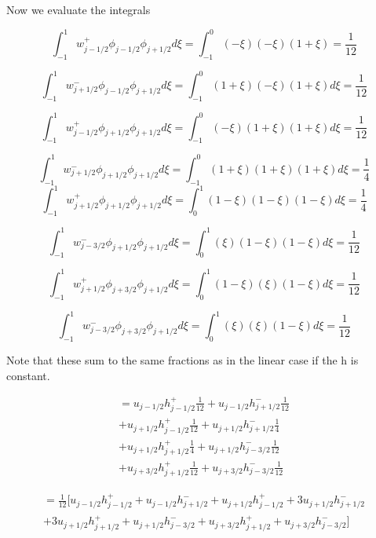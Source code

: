 \documentclass[12pt]{article}
\begin{document}
Now we evaluate the integrals

\[\int_{-1}^{1} w^+_{j - 1/2}\phi_{j - 1/2}\phi_{j+1/2}d\xi = \int_{-1}^{0}\left(-\xi\right)\left(-\xi\right)\left(1 + \xi\right)  =  \frac{1}{12 }\]

\[\int_{-1}^{1}w^-_{j + 1/2}\phi_{j - 1/2}\phi_{j+1/2} d\xi =  \int_{-1}^{0}\left(1 + \xi\right)\left(-\xi\right) \left(1 + \xi\right) d\xi = \frac{1}{12}\]

\[\int_{-1}^{1} w^+_{j - 1/2}\phi_{j+1/2}\phi_{j+1/2} d\xi =  \int_{-1}^{0}\left(-\xi\right)\left(1 + \xi\right) \left(1 + \xi\right) d\xi= \frac{1}{12} \]

\[\int_{-1}^{1} w^-_{j + 1/2}\phi_{j+1/2}\phi_{j+1/2} d\xi = \int_{-1}^{0}\left(1 + \xi\right)\left(1 + \xi\right) \left(1 + \xi\right) d\xi = \frac{1}{4}\]
\[\int_{-1}^{1} w^+_{j + 1/2}\phi_{j+1/2}\phi_{j+1/2} d\xi = \int_{0}^{1}\left(1 - \xi\right)\left(1 - \xi\right)\left(1 - \xi\right) d\xi= \frac{1}{4} \]

\[\int_{-1}^{1} w^-_{j - 3/2}\phi_{j+1/2}\phi_{j+1/2} d\xi =\int_{0}^{1}\left(\xi\right)\left(1 - \xi\right)\left(1 - \xi\right) d\xi = \frac{1}{12} \]

\[\int_{-1}^{1} w^+_{j + 1/2}\phi_{j+ 3/2}\phi_{j+1/2} d\xi = \int_{0}^{1}\left(1 - \xi\right)\left(\xi\right)\left(1 - \xi\right) d\xi = \frac{1}{12} \]

\[\int_{-1}^{1} w^-_{j - 3/2}\phi_{j+ 3/2}\phi_{j+1/2} d\xi = \int_{0}^{1}\left(\xi\right)\left(\xi\right)\left(1 - \xi\right) d\xi = \frac{1}{12}  \]

Note that these sum to the same fractions as in the linear case if the h is constant. 

\begin{multline}
=u_{j- 1/2}h^+_{j- 1/2}\frac{1}{12 } + u_{j- 1/2}h^-_{j+ 1/2}\frac{1}{12 }\\
+  u_{j+1/2}h^+_{j- 1/2}\frac{1}{12 } + u_{j+1/2}h^-_{j+ 1/2}\frac{1}{4} \\ + u_{j+1/2} h^+_{j+ 1/2}\frac{1}{4 }   + u_{j+1/2} h^-_{j- 3/2}\frac{1}{12 } \\
+u_{j+ 3/2}h^+_{j+ 1/2}\frac{1}{12 } + u_{j+ 3/2}h^-_{j- 3/2}\frac{1}{12 }
\end{multline}

\begin{multline}
= \frac{1}{12} \bigg[ u_{j- 1/2}h^+_{j- 1/2} + u_{j- 1/2}h^-_{j+ 1/2}
+  u_{j+1/2}h^+_{j- 1/2} + 3u_{j+1/2}h^-_{j+ 1/2} \\ + 3u_{j+1/2} h^+_{j+ 1/2}  + u_{j+1/2} h^-_{j- 3/2}
+u_{j+ 3/2}h^+_{j+ 1/2} + u_{j+ 3/2}h^-_{j- 3/2} \bigg]
\end{multline}
\end{document}

